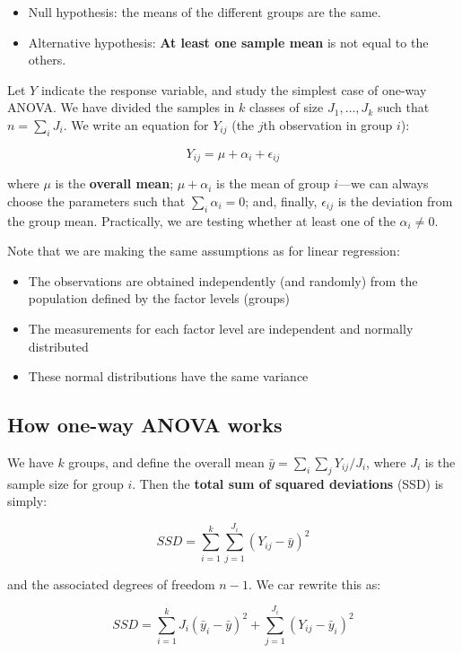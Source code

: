 \documentclass[
  letterpaper,
  DIV=11,
  numbers=noendperiod]{scrreprt}
\providecommand{\tightlist}{%
  \setlength{\itemsep}{0pt}\setlength{\parskip}{0pt}}\usepackage{longtable,booktabs,array}
\begin{document}
\begin{itemize}
\tightlist
\item
  Null hypothesis: the means of the different groups are the same.
\item
  Alternative hypothesis: \textbf{At least one sample mean} is not equal
  to the others.
\end{itemize}

Let \(Y\) indicate the response variable, and study the simplest case of
one-way ANOVA. We have divided the samples in \(k\) classes of size
\(J_1, \ldots, J_k\) such that \(n=\sum_i J_i\). We write an equation
for \(Y_{ij}\) (the \(j\)th observation in group \(i\)):

\[
Y_{ij} = \mu + \alpha_i + \epsilon_{ij}
\]

where \(\mu\) is the \textbf{overall mean}; \(\mu + \alpha_i\) is the
mean of group \(i\)---we can always choose the parameters such that
\(\sum_i \alpha_i = 0\); and, finally, \(\epsilon_{ij}\) is the
deviation from the group mean. Practically, we are testing whether at
least one of the \(\alpha_i \neq 0\).

Note that we are making the same assumptions as for linear regression:

\begin{itemize}
\tightlist
\item
  The observations are obtained independently (and randomly) from the
  population defined by the factor levels (groups)
\item
  The measurements for each factor level are independent and normally
  distributed
\item
  These normal distributions have the same variance
\end{itemize}

\subsection{How one-way ANOVA works}\label{how-one-way-anova-works}

We have \(k\) groups, and define the overall mean
\(\bar{y} = \sum_i \sum_j Y_{ij} / J_{i}\), where \(J_i\) is the sample
size for group \(i\). Then the \textbf{total sum of squared deviations}
(SSD) is simply:

\[
SSD = \sum_{i = 1}^k \sum_{j = 1}^{J_{i}} \left(Y_{ij} - \bar{y}\right)^2
\]

and the associated degrees of freedom \(n-1\). We car rewrite this as:

\[
SSD = \sum_{i = 1}^k J_{i} \left(\bar{y}_i - \bar{y} \right)^2 + \sum_{j = 1}^{J_{i}} \left(Y_{ij} - \bar{y}_i \right)^2
\]
\end{document}

